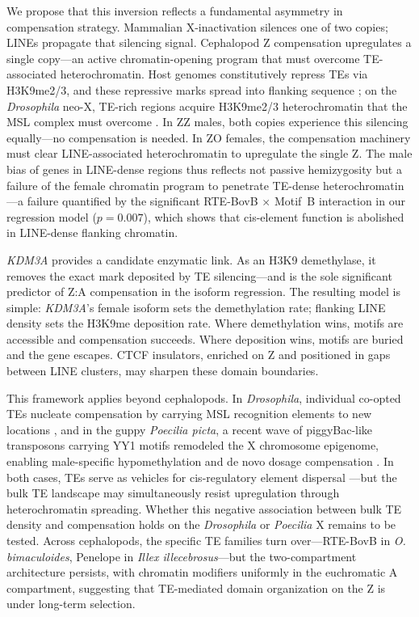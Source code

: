 \documentclass[12pt]{article}
\newcommand{\citep}{\parencite}
\newcommand{\illex}{\textit{Illex illecebrosus}\xspace}
\begin{document}
We propose that this inversion reflects a fundamental asymmetry
in compensation strategy.
Mammalian X-inactivation silences one of two copies;
LINEs propagate that silencing signal.
Cephalopod Z compensation upregulates a single copy---an
active chromatin-opening program that must overcome
TE-associated heterochromatin.
Host genomes constitutively repress TEs via H3K9me2/3,
and these repressive marks spread into flanking sequence
\citep{lee2017pervasive, huang2022species};
on the \textit{Drosophila} neo-X, TE-rich regions acquire
H3K9me2/3 heterochromatin that the MSL complex must overcome
\citep{zhou2013epigenome}.
In ZZ males, both copies experience this silencing equally---no
compensation is needed.
In ZO females, the compensation machinery must clear
LINE-associated heterochromatin to upregulate the single Z.
The male bias of genes in LINE-dense regions thus reflects
not passive hemizygosity but a failure of the female chromatin program
to penetrate TE-dense heterochromatin---a failure
quantified by the significant RTE-BovB $\times$ Motif~B interaction
in our regression model ($p = 0.007$),
which shows that cis-element function is abolished
in LINE-dense flanking chromatin.

\textit{KDM3A} provides a candidate enzymatic link.
As an H3K9 demethylase, it removes the exact mark deposited by TE silencing---and
is the sole significant predictor of Z:A compensation
in the isoform regression.
The resulting model is simple:
\textit{KDM3A}'s female isoform sets the demethylation rate;
flanking LINE density sets the H3K9me deposition rate.
Where demethylation wins, motifs are accessible and compensation succeeds.
Where deposition wins, motifs are buried and the gene escapes.
CTCF insulators, enriched on Z and positioned in gaps between LINE clusters,
may sharpen these domain boundaries.

This framework applies beyond cephalopods.
In \textit{Drosophila}, individual co-opted TEs nucleate compensation
by carrying MSL recognition elements to new locations
\citep{ellison2013dosage},
and in the guppy \textit{Poecilia picta},
a recent wave of piggyBac-like transposons carrying YY1 motifs
remodeled the X chromosome epigenome,
enabling male-specific hypomethylation and de novo dosage compensation
\citep{metzger2023transposon}.
In both cases, TEs serve as vehicles for cis-regulatory element dispersal
\citep{britten1971repetitive, lee2024causes}---but
the bulk TE landscape may simultaneously resist upregulation
through heterochromatin spreading.
Whether this negative association between bulk TE density and
compensation holds on the \textit{Drosophila} or \textit{Poecilia} X
remains to be tested.
Across cephalopods, the specific TE families turn over---RTE-BovB
in \textit{O. bimaculoides}, Penelope in \illex---but
the two-compartment architecture persists,
with chromatin modifiers uniformly in the euchromatic A compartment,
suggesting that TE-mediated domain organization on the Z
is under long-term selection.
\end{document}
